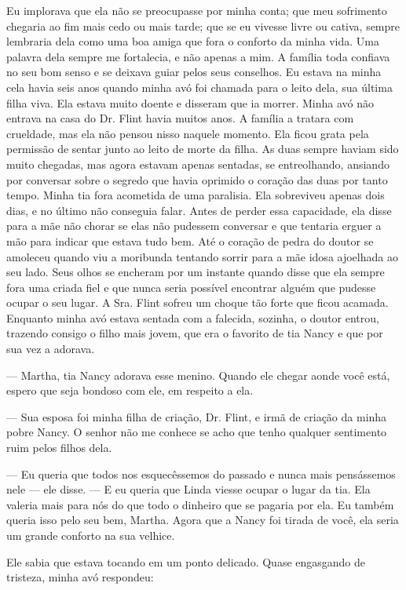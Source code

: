 Eu implorava que ela não se preocupasse por minha conta; que meu
sofrimento chegaria ao fim mais cedo ou mais tarde; que se eu vivesse
livre ou cativa, sempre lembraria dela como uma boa amiga que fora o
conforto da minha vida. Uma palavra dela sempre me fortalecia, e não
apenas a mim. A família toda confiava no seu bom senso e se deixava
guiar pelos seus conselhos. Eu estava na minha cela havia seis anos
quando minha avó foi chamada para o leito dela, sua última filha viva.
Ela estava muito doente e disseram que ia morrer. Minha avó não entrava
na casa do Dr. Flint havia muitos anos. A família a tratara com
crueldade, mas ela não pensou nisso naquele momento. Ela ficou grata
pela permissão de sentar junto ao leito de morte da filha. As duas
sempre haviam sido muito chegadas, mas agora estavam apenas sentadas, se
entreolhando, ansiando por conversar sobre o segredo que havia oprimido
o coração das duas por tanto tempo. Minha tia fora acometida de uma
paralisia. Ela sobreviveu apenas dois dias, e no último não conseguia
falar. Antes de perder essa capacidade, ela disse para a mãe não chorar
se elas não pudessem conversar e que tentaria erguer a mão para indicar
que estava tudo bem. Até o coração de pedra do doutor se amoleceu quando
viu a moribunda tentando sorrir para a mãe idosa ajoelhada ao seu lado.
Seus olhos se encheram por um instante quando disse que ela sempre fora
uma criada fiel e que nunca seria possível encontrar alguém que pudesse
ocupar o seu lugar. A Sra. Flint sofreu um choque tão forte que ficou
acamada. Enquanto minha avó estava sentada com a falecida, sozinha, o
doutor entrou, trazendo consigo o filho mais jovem, que era o favorito
de tia Nancy e que por sua vez a adorava.

--- Martha, tia Nancy adorava esse menino. Quando ele chegar aonde você
está, espero que seja bondoso com ele, em respeito a ela.

--- Sua esposa foi minha filha de criação, Dr. Flint, e irmã de criação
da minha pobre Nancy. O senhor não me conhece se acho que tenho qualquer
sentimento ruim pelos filhos dela.

--- Eu queria que todos nos
esquecêssemos do passado e nunca mais pensássemos nele --- ele disse.
--- E eu queria que Linda viesse ocupar o lugar da tia. Ela valeria mais
para nós do que todo o dinheiro que se pagaria por ela. Eu também queria
isso pelo seu bem, Martha. Agora que a Nancy foi tirada de você, ela
seria um grande conforto na sua velhice.

Ele sabia que estava tocando em um ponto delicado. Quase engasgando de
tristeza, minha avó respondeu:

